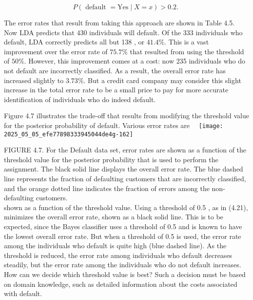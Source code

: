 \documentclass[10pt]{article}
\begin{document}
\begin{equation*}
P(\text { default }=\mathrm{Yes} \mid X=x)>0.2 \text {. } \tag{4.22}
\end{equation*}


The error rates that result from taking this approach are shown in Table 4.5. Now LDA predicts that 430 individuals will default. Of the 333 individuals who default, LDA correctly predicts all but 138 , or $41.4 \%$. This is a vast improvement over the error rate of $75.7 \%$ that resulted from using the threshold of $50 \%$. However, this improvement comes at a cost: now 235 individuals who do not default are incorrectly classified. As a result, the overall error rate has increased slightly to $3.73 \%$. But a credit card company may consider this slight increase in the total error rate to be a small price to pay for more accurate identification of individuals who do indeed default.

Figure 4.7 illustrates the trade-off that results from modifying the threshold value for the posterior probability of default. Various error rates are\
\
\texttt{[image: 2025\_05\_05\_efe77898333945044de4g-162]}

FIGURE 4.7. For the Default data set, error rates are shown as a function of the threshold value for the posterior probability that is used to perform the assignment. The black solid line displays the overall error rate. The blue dashed line represents the fraction of defaulting customers that are incorrectly classified, and the orange dotted line indicates the fraction of errors among the non-defaulting customers.\\
shown as a function of the threshold value. Using a threshold of 0.5 , as in (4.21), minimizes the overall error rate, shown as a black solid line. This is to be expected, since the Bayes classifier uses a threshold of 0.5 and is known to have the lowest overall error rate. But when a threshold of 0.5 is used, the error rate among the individuals who default is quite high (blue dashed line). As the threshold is reduced, the error rate among individuals who default decreases steadily, but the error rate among the individuals who do not default increases. How can we decide which threshold value is best? Such a decision must be based on domain knowledge, such as detailed information about the costs associated with default.
\end{document}
